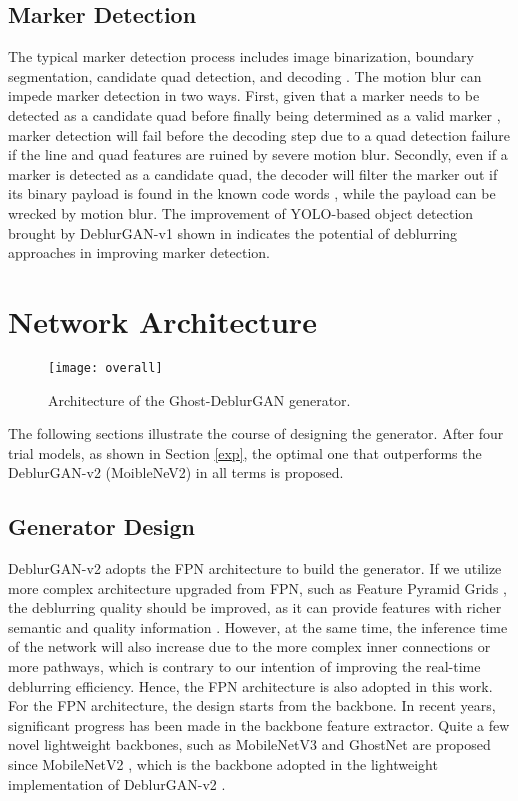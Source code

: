 \documentclass[letterpaper, 10 pt, conference]{ieeeconf}
\begin{document}
\subsection{Marker Detection}
The typical marker detection process includes image binarization, boundary segmentation, candidate quad detection, and decoding \cite{ap3,aruco}. The motion blur can impede marker detection in two ways. First, given that a marker needs to be detected as a candidate quad before finally being determined as a valid marker \cite{ap3}, marker detection will fail before the decoding step due to a quad detection failure if the line and quad features are ruined by severe motion blur. Secondly, even if a marker is detected as a candidate quad, the decoder will filter the marker out if its binary payload is found in the known code words \cite{ap3}, while the payload can be wrecked by motion blur. The improvement of YOLO-based object detection brought by DeblurGAN-v1 shown in \cite{deblurgan1} indicates the potential of deblurring approaches in improving marker detection.



\section{Network Architecture}
\begin{figure*}
\centering
\texttt{[image: overall]}
\caption{Architecture of the Ghost-DeblurGAN generator.}
\label{overall}
\end{figure*}

The following sections illustrate the course of designing the generator. After four trial models, as shown in Section \ref{exp}, the optimal one that outperforms the DeblurGAN-v2 (MoibleNeV2) \cite{deblurgan2} in all terms is proposed.


\subsection{Generator Design}
DeblurGAN-v2 adopts the FPN \cite{fpn} architecture to build the generator. If we utilize more complex architecture upgraded from FPN, such as Feature Pyramid Grids \cite{fpg}, the deblurring quality should be improved, as it can provide features with richer semantic and quality information \cite{fpg}. However, at the same time, the inference time of the network will also increase due to the more complex inner connections or more pathways, which is contrary to our intention of improving the real-time deblurring efficiency. Hence, the FPN architecture is also adopted in this work. For the FPN architecture, the design starts from the backbone. In recent years, significant progress has been made in the backbone feature extractor. Quite a few novel lightweight backbones, such as MobileNetV3 \cite{mobilenetv3} and GhostNet \cite{ghostnet} are proposed since MobileNetV2 \cite{mobilenetv2}, which is the backbone adopted in the lightweight implementation of DeblurGAN-v2 \cite{deblurgan2}. 
\end{document}
